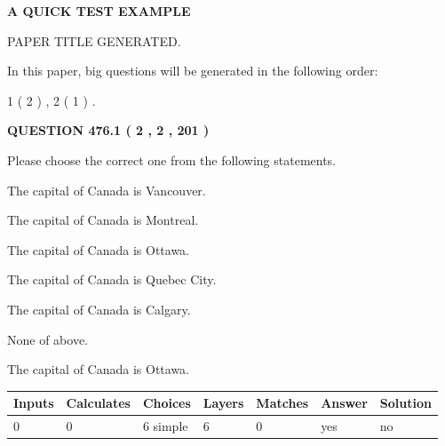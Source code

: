 \documentclass[12pt]{article}
\begin{document}
   
 \vspace{0.2in}
{\LARGE {\textbf{ A QUICK TEST EXAMPLE}}}
   
   
 PAPER TITLE GENERATED.
   
   
   
\vspace{0.2in}
   
In this paper, big questions will be generated in the following order: 
   
   
   1 ( 2 )
 ,
   2 ( 1 )
 .
  
\vspace{0.2in}
  
{\textbf{\Large{QUESTION
476.1 
 ( 2 , 2 , 201 )
}}}
  
  
Please choose the correct one from the following statements.
 
 
The capital of Canada is Vancouver.
 
 
The capital of Canada is Montreal.
 
 
The capital of Canada is Ottawa.
 
 
The capital of Canada is Quebec City.
 
 
The capital of Canada is Calgary.
 
 
 None of above.
 
 
\noindent{}
 
 
The capital of Canada is Ottawa.
 
 
\noindent{}
 
 
   
   
   
   
\noindent\begin{tabular}{|l|l|l|l|l|l|l|}
 \hline
Inputs & Calculates & Choices & Layers & Matches & Answer & Solution \\ \hline
 0  & 
 0  & 
 6
  simple  
  & 
 6  & 
 0  & 
  yes & 
  no 
  \\ \hline
 \end{tabular}
   
   
   
   
\noindent{}
   
\end{document}

